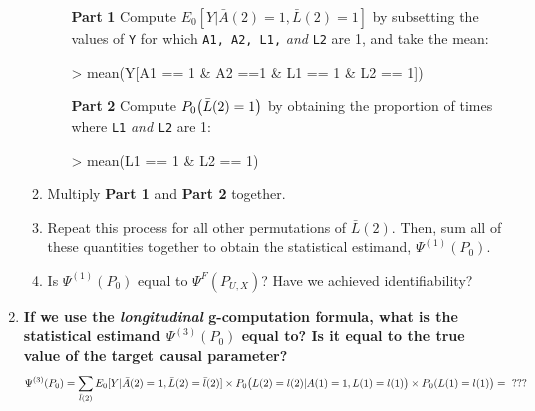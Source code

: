\documentclass{exam}
\begin{document}
\begin{enumerate}
\begin{enumerate}
\vspace{4mm}
\begin{itemize}
\item[\textbf{Part}] \textbf{1} Compute $E_0[Y|\bar{A}(2)=1, \bar{L}(2) = 1]$ by subsetting the values of \texttt{Y} for which \texttt{A1, A2, L1,} \textit{and} \texttt{L2} are 1, and take the mean:
\vspace{2mm}
\begin{Schunk}
\begin{Sinput}
> mean(Y[A1 == 1 & A2 ==1 & L1 == 1 & L2 == 1])
\end{Sinput}
\end{Schunk}
\vspace{4mm}
\item[\textbf{Part}] \textbf{2} Compute $P_0\big{(}\bar{L}(2) = 1\big{)}$ by obtaining the proportion of times where \texttt{L1} \textit{and} \texttt{L2} are 1: 
\vspace{2mm}
\begin{Schunk}
\begin{Sinput}
> mean(L1 == 1 & L2 == 1)
\end{Sinput}
\end{Schunk}
\vspace{4mm}
\end{itemize}
\item Multiply \textbf{Part 1} and \textbf{Part 2} together.
\item Repeat this process for all other permutations of $\bar{L}(2)$. Then, sum  all of these quantities together to obtain the statistical estimand, $\Psi^{(1)}(P_0)$.
\item Is $\Psi^{(1)}(P_0)$ equal to $\Psi^F(P_{U,X})$? Have we achieved identifiability?
\end{enumerate}





\item \textbf{If we use the \textit{longitudinal} g-computation formula, what is the statistical estimand $\Psi^{(3)}(P_0)$ equal to? Is it equal to the true value of the target causal parameter?} 
\[
\Psi^{(3)}(P_0) = \sum_{\bar{l}(2)}E_0[Y | \bar{A}(2)=1, \bar{L}(2) = \bar{l}(2)] \times P_0\big{(}L(2) = l(2) | A(1)=1, L(1) = l(1)\big{)} \times P_0(L(1) = l(1)\big{)} =  \text{ ???}
\]


\end{enumerate}
\end{document}
